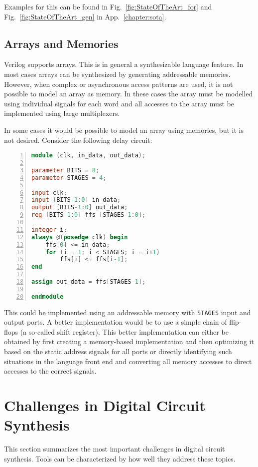 Examples for this can be found in Fig.~\ref{fig:StateOfTheArt_for} and
Fig.~\ref{fig:StateOfTheArt_gen} in App.~\ref{chapter:sota}.

\subsection{Arrays and Memories}

Verilog supports arrays. This is in general a synthesizable language feature.
In most cases arrays can be synthesized by generating addressable memories.
However, when complex or asynchronous access patterns are used, it is not
possible to model an array as memory. In these cases the array must
be modelled using individual signals for each word and all accesses to the array
must be implemented using large multiplexers.

In some cases it would be possible to model an array using memories, but it
is not desired. Consider the following delay circuit:
\begin{lstlisting}[numbers=left,frame=single,language=Verilog]
module (clk, in_data, out_data);

parameter BITS = 8;
parameter STAGES = 4;

input clk;
input [BITS-1:0] in_data;
output [BITS-1:0] out_data;
reg [BITS-1:0] ffs [STAGES-1:0];

integer i;
always @(posedge clk) begin
	ffs[0] <= in_data;
	for (i = 1; i < STAGES; i = i+1)
		ffs[i] <= ffs[i-1];
end

assign out_data = ffs[STAGES-1];

endmodule
\end{lstlisting}

This could be implemented using an addressable memory with {\tt STAGES} input
and output ports. A better implementation would be to use a simple chain of flip-flops
(a so-called shift register).
This better implementation can either be obtained by first creating a memory-based
implementation and then optimizing it based on the static address signals for all ports
or directly identifying such situations in the language front end and converting
all memory accesses to direct accesses to the correct signals.

\section{Challenges in Digital Circuit Synthesis}

This section summarizes the most important challenges in digital circuit
synthesis. Tools can be characterized by how well they address these topics.

